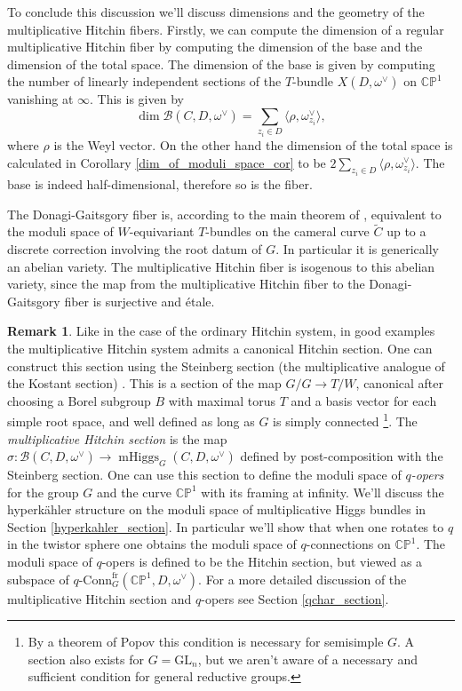 \documentclass[11pt, oneside, reqno]{amsart}
\theoremstyle{definition} \newtheorem{definition}{Definition}[section]
\theoremstyle{definition} \newtheorem{remark}[definition]{Remark}
\theoremstyle{definition} \newtheorem{remarks}[definition]{Remarks}
\theoremstyle{definition} \newtheorem{question}[definition]{Question}
\theoremstyle{definition} \newtheorem*{note}{Note}
\theoremstyle{definition} \newtheorem{example}[definition]{Example}
\theoremstyle{definition} \newtheorem{examples}[definition]{Examples}
\newcommand{\bb}[1]{\mathbb{#1}}
\newcommand{\mc}[1]{\mathcal{#1}}
\newcommand{\wt}[1]{\widetilde{#1}}
\newcommand{\GL}{\mathrm{GL}}
\DeclareMathOperator{\mhiggs}{mHiggs}
\newcommand{\qconn}{q\text{-Conn}}
\newcommand{\fr}{\mathrm{fr}}
\begin{document}
To conclude this discussion we'll discuss dimensions and the geometry of the multiplicative Hitchin fibers.  Firstly, we can compute the dimension of a regular multiplicative Hitchin fiber by computing the dimension of the base and the dimension of the total space.  The dimension of the base is given by computing the number of linearly independent sections of the $T$-bundle $X(D,\omega^\vee)$ on $\bb{CP}^1$ vanishing at $\infty$.  This is given by 
\[\dim \mc B(C,D,\omega^\vee) = \sum_{z_i \in D} \langle \rho, \omega^\vee_{z_i} \rangle,\]
where $\rho$ is the Weyl vector.  On the other hand the dimension of the total space is calculated in Corollary \ref{dim_of_moduli_space_cor} to be $2 \sum_{z_i \in D} \langle \rho, \omega^\vee_{z_i} \rangle$.  The base is indeed half-dimensional, therefore so is the fiber.

The Donagi-Gaitsgory fiber is, according to the main theorem of \cite{DonagiGaitsgory}, equivalent to the moduli space of $W$-equivariant $T$-bundles on the cameral curve $\wt C$ up to a discrete correction involving the root datum of $G$.  In particular it is generically an abelian variety.  The multiplicative Hitchin fiber is isogenous to this abelian variety, since the map from the multiplicative Hitchin fiber to the Donagi-Gaitsgory fiber is surjective and \'etale.

\begin{remark} \label{q_opers_remark}
Like in the case of the ordinary Hitchin system, in good examples the multiplicative Hitchin system admits a canonical Hitchin section.  One can construct this section using the Steinberg section (the multiplicative analogue of the Kostant section) \cite{Steinberg}.  This is a section of the map $G/G \to T/W$, canonical after choosing a Borel subgroup $B$ with maximal torus $T$ and a basis vector for each simple root space, and well defined as long as $G$ is simply connected \footnote{By a theorem of Popov \cite{Popov} this condition is necessary for semisimple $G$.  A section also exists for $G = \GL_n$, but we aren't aware of a necessary and sufficient condition for general reductive groups.}.  The \emph{multiplicative Hitchin section} is the map $\sigma \colon \mc B(C,D,\omega^\vee) \to \mhiggs_G(C,D,\omega^\vee)$ defined by post-composition with the Steinberg section.  One can use this section to define the moduli space of \emph{$q$-opers} for the group $G$ and the curve $\bb{CP}^1$ with its framing at infinity.  We'll discuss the hyperk\"ahler structure on the moduli space of multiplicative Higgs bundles in Section \ref{hyperkahler_section}.  In particular we'll show that when one rotates to $q$ in the twistor sphere one obtains the moduli space of $q$-connections on $\bb{CP}^1$.  The moduli space of $q$-opers is defined to be the Hitchin section, but viewed as a subspace of $\qconn^{\fr}_G(\bb{CP}^1,D,\omega^\vee)$.  For a more detailed discussion of the multiplicative Hitchin section and $q$-opers see Section \ref{qchar_section}. 
\end{remark}
\end{document}
